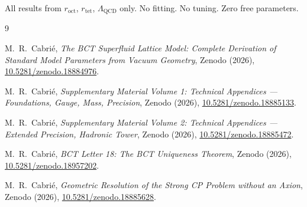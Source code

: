 \documentclass[aps,prl,twocolumn,showpacs,preprintnumbers]{revtex4-2}
\newcommand{\roct}{r_{\mathrm{oct}}}
\newcommand{\rtet}{r_{\mathrm{tet}}}
\newcommand{\LQCD}{\Lambda_{\mathrm{QCD}}}
\begin{document}
\noindent All results from $\roct$, $\rtet$, $\LQCD$ only.
No fitting. No tuning. Zero free parameters.

\begin{thebibliography}{9}

M.~R.\ Cabri\'e,
\textit{The BCT Superfluid Lattice Model: Complete Derivation of
Standard Model Parameters from Vacuum Geometry},
Zenodo (2026),
\href{https://doi.org/10.5281/zenodo.18884976}{10.5281/zenodo.18884976}.

M.~R.\ Cabri\'e,
\textit{Supplementary Material Volume 1: Technical Appendices ---
Foundations, Gauge, Mass, Precision},
Zenodo (2026),
\href{https://doi.org/10.5281/zenodo.18885133}{10.5281/zenodo.18885133}.

M.~R.\ Cabri\'e,
\textit{Supplementary Material Volume 2: Technical Appendices ---
Extended Precision, Hadronic Tower},
Zenodo (2026),
\href{https://doi.org/10.5281/zenodo.18885472}{10.5281/zenodo.18885472}.

M.~R.\ Cabri\'e,
\textit{BCT Letter 18: The BCT Uniqueness Theorem},
Zenodo (2026),
\href{https://doi.org/10.5281/zenodo.18957202}{10.5281/zenodo.18957202}.

M.~R.\ Cabri\'e,
\textit{Geometric Resolution of the Strong CP Problem without an Axion},
Zenodo (2026),
\href{https://doi.org/10.5281/zenodo.18885628}{10.5281/zenodo.18885628}.

\end{thebibliography}
\end{document}

